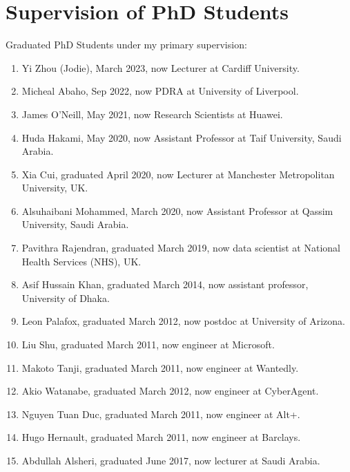 \documentclass[a4paper,11pt]{article}
\begin{document}
\section{Supervision of PhD Students}
Graduated PhD Students under my primary supervision:
\begin{enumerate}
\item Yi Zhou (Jodie), March 2023, now Lecturer at Cardiff University.
\item Micheal Abaho, Sep 2022, now PDRA at University of Liverpool.
\item James O'Neill, May 2021, now Research Scientists at Huawei.
\item Huda Hakami, May 2020, now Assistant Professor at Taif University, Saudi Arabia.
\item Xia Cui, graduated April 2020, now Lecturer at Manchester Metropolitan University, UK.
\item Alsuhaibani Mohammed, March 2020, now Assistant Professor at  Qassim University, Saudi Arabia.
\item Pavithra Rajendran, graduated March 2019, now data scientist at National Health Services (NHS), UK.
\item Asif Hussain Khan, graduated March 2014, now assistant professor, University of Dhaka.
\item Leon Palafox, graduated March 2012, now postdoc at University of Arizona.
\item Liu Shu, graduated March 2011, now engineer at Microsoft.
\item Makoto Tanji, graduated March 2011, now engineer at Wantedly.
\item Akio Watanabe, graduated March 2012, now engineer at CyberAgent.
\item Nguyen Tuan Duc, graduated March 2011, now engineer at Alt+.
\item Hugo Hernault, graduated March 2011, now engineer at Barclays.
\item  Abdullah Alsheri, graduated June 2017, now lecturer at Saudi Arabia.
\end{enumerate}
\end{document}

